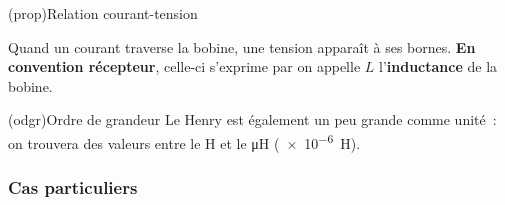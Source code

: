 \documentclass[../../main/main.tex]{subfiles}
\begin{document}
\begin{tcb*}[label=prop:Lcarac, sidebyside, righthand ratio=.3](prop){Relation courant-tension}
	\begin{isd}[righthand ratio=.3, sidebyside align=top]
		Quand un courant traverse la bobine, une tension apparaît à ses bornes.
		\textbf{En convention récepteur}, celle-ci s'exprime par
		\psw{%
			\[\boxed{u_L = L\dv{i}{t}}\]
		}%
		\tcblower
		on appelle $L$ l'\textbf{inductance} de la bobine.
	\end{isd}
	\tcblower
	\begin{center}
	\end{center}
\end{tcb*}

\begin{tcb*}(odgr){Ordre de grandeur}
	Le Henry est également un peu grande comme unité~: on trouvera des valeurs
	entre le \si{H} et le \si{\micro H} (\SI{e-6}{H}).
\end{tcb*}

\subsubsection{Cas particuliers}
\end{document}
